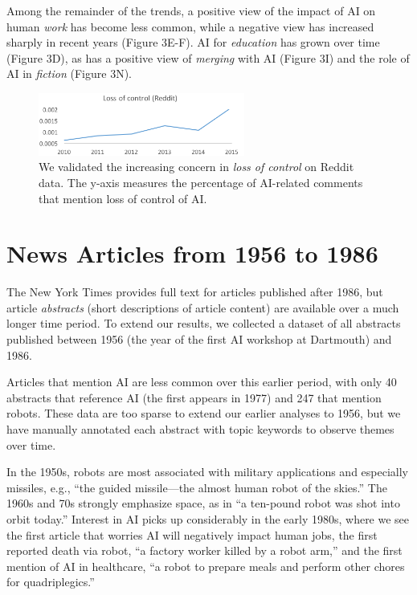 \documentclass[letterpaper]{article}
\begin{document}
Among the remainder of the trends, a positive view of the impact of AI on human \textit{work} has become less common, while a negative view has increased sharply in recent years (Figure 3E-F). AI for \textit{education} has grown over time (Figure 3D), as has a positive view of \textit{merging} with AI (Figure 3I) and the role of AI in \textit{fiction} (Figure 3N).

\begin{figure}[!t]
\centering
\includegraphics[width=0.8\columnwidth,height=0.81in ]{ai-reddit2}
\caption{We validated the increasing concern in \textit{loss of control} on Reddit data. The y-axis measures the percentage of AI-related comments that mention loss of control of AI.}
\label{fig:replicate}
\end{figure}

\section{News Articles from 1956 to 1986}

The New York Times provides full text for articles published after 1986, but article \textit{abstracts} (short descriptions of article content) are available over a much longer time period. To extend our results, we collected a dataset of all abstracts published between 1956 (the year of the first AI workshop at Dartmouth) and 1986.

Articles that mention AI are less common over this earlier period, with only 40 abstracts that reference AI (the first appears in 1977) and 247 that mention robots. These data are too sparse to extend our earlier analyses to 1956, but we have manually annotated each abstract with topic keywords to observe themes over time.

In the 1950s, robots are most associated with military applications and especially missiles, e.g., ``the guided missile---the almost human robot of the skies.'' The 1960s and 70s strongly emphasize space, as in ``a ten-pound robot was shot into orbit today.'' Interest in AI picks up considerably in the early 1980s, where we see the first article that worries AI will negatively impact human jobs, the first reported death via robot, ``a factory worker killed by a robot arm,'' and the first mention of AI in healthcare, ``a robot to prepare meals and perform other chores for quadriplegics.''
\end{document}
